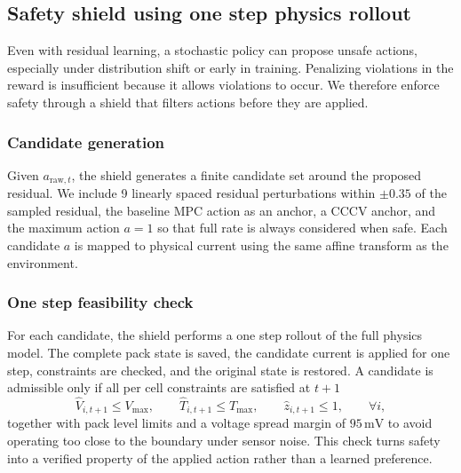 \documentclass[%
 aip,
 amsmath,amssymb,
reprint, onecolumn %
]{revtex4-1}
\begin{document}
\subsection{Safety shield using one step physics rollout}
Even with residual learning, a stochastic policy can propose unsafe actions, especially under distribution shift or early in training. Penalizing violations in the reward is insufficient because it allows violations to occur. We therefore enforce safety through a shield that filters actions before they are applied.

\subsubsection{Candidate generation}
Given $a_{\mathrm{raw},t}$, the shield generates a finite candidate set around the proposed residual. We include 9 linearly spaced residual perturbations within $\pm 0.35$ of the sampled residual, the baseline MPC action as an anchor, a CCCV anchor, and the maximum action $a=1$ so that full rate is always considered when safe. Each candidate $a$ is mapped to physical current using the same affine transform as the environment.

\subsubsection{One step feasibility check}
For each candidate, the shield performs a one step rollout of the full physics model. The complete pack state is saved, the candidate current is applied for one step, constraints are checked, and the original state is restored. A candidate is admissible only if all per cell constraints are satisfied at $t+1$
\begin{equation}
\hat V_{i,t+1} \le V_{\max},
\qquad
\hat T_{i,t+1} \le T_{\max},
\qquad
\hat z_{i,t+1} \le 1,
\qquad
\forall i,
\end{equation}
together with pack level limits and a voltage spread margin of $95\,\mathrm{mV}$ to avoid operating too close to the boundary under sensor noise. This check turns safety into a verified property of the applied action rather than a learned preference.
\end{document}
